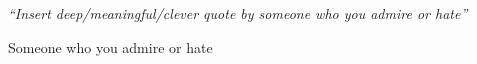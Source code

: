 \documentclass[a4paper, 12pt, twoside, openright]{Thesis}  %
\begin{document}
\frontmatter	           %






\fancyhead{}        %
\rhead{\thepage}    %
\lhead{}            %
\pagestyle{fancy}   %
\clearpage          %

\pagestyle{empty}   %
\null\vfill

\vfill\vfill\vfill\vfill\vfill\vfill\null
\clearpage          %



\pagestyle{empty}  %

\null\vfill
\textit{``Insert deep/meaningful/clever quote by someone who you admire or hate''}

\begin{flushright}
  Someone who you admire or hate
\end{flushright}

\vfill\vfill\vfill\vfill\vfill\vfill\null
\clearpage  %

%
%
%
\end{document}

